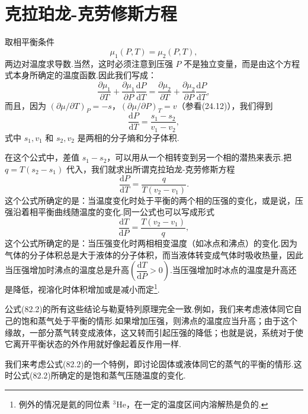 \section{克拉珀龙-克劳修斯方程}

取相平衡条件
\begin{equation*}
  \mu_1(P,T)=\mu_2(P,T),
\end{equation*}
两边对温度求导数.当然，这时必须注意到压强 $P$ 不是独立变量，而是由这个方程式本身所确定的温度函数.因此我们写成：
\begin{equation*}
  \frac{\partial\mu_1}{\partial T}+\frac{\partial\mu_1}{\partial P}\frac{\mathrm{d}P}{\mathrm{d}T}
  =\frac{\partial\mu_2}{\partial T}+\frac{\partial\mu_2}{\partial P}\frac{\mathrm{d}P}{\mathrm{d}T},
\end{equation*}
而且，因为 $(\partial\mu/\partial T)_P=-s$，$(\partial\mu/\partial P)_T=v$（参看(24.12)），我们得到
\begin{equation}
  \frac{\mathrm{d}P}{\mathrm{d}T}=\frac{s_1-s_2}{v_1-v_2},
\end{equation}
式中 $s_1,v_1$ 和 $s_2,v_2$ 是两相的分子熵和分子体积.

在这个公式中，差值 $s_1-s_2$，可以用从一个相转变到另一个相的潜热来表示.把 $q=T(s_2-s_1)$ 代入，我们就求出所谓克拉珀龙-克劳修斯方程
\begin{equation}
  \frac{\mathrm{d}P}{\mathrm{d}T}=\frac{q}{T(v_2-v_1)}.
\end{equation}
这个公式所确定的是：当温度变化时处于平衡的两个相的压强的变化，或是说，压强沿着相平衡曲线随温度的变化.同一公式也可以写成形式
\begin{equation*}
  \frac{\mathrm{d}T}{\mathrm{d}P}=\frac{T(v_2-v_1)}{q},
\end{equation*}
这个公式所确定的是：当压强变化时两相相变温度（如冰点和沸点）的变化.因为气体的分子体积总是大于液体的分子体积，而当液体转变成气体时吸收热量，因此当压强增加时沸点的温度总是升高$\left(\dfrac{\mathrm{d}T}{\mathrm{d}P}>0\right)$.当压强增加时冰点的温度是升高还是降低，视溶化时体积增加或是减小而定\footnote{例外的情况是氦的同位素 ${}^3\mathrm{He}$，在一定的温度区间内溶解热是负的.}.

公式(82.2)的所有这些结论与勒夏特列原理完全一致.例如，我们来考虑液体同它自己的饱和蒸气处于平衡的情形.如果增加压强，则沸点的温度应当升高；由于这个缘故，一部分蒸气转变成液体，这又转而引起压强的降低；也就是说，系统对于使它离开平衡状态的外作用就好像起着反作用一样.

我们来考虑公式(82.2)的一个特例，即讨论固体或液体同它的蒸气的平衡的情形.这时公式(82.2)所确定的是饱和蒸气压随温度的变化.

